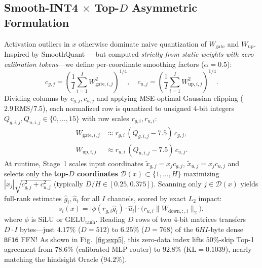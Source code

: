 \documentclass[10pt,twocolumn]{article}
\begin{document}
\subsection{Smooth-INT4 $\times$ Top-$D$ Asymmetric Formulation}
Activation outliers in $x$ otherwise dominate naive quantization of $W_{\mathrm{gate}}$ and $W_{\mathrm{up}}$. Inspired by SmoothQuant~\cite{xiao2023smoothquant}---but computed \emph{strictly from static weights with zero calibration tokens}---we define per-coordinate smoothing factors ($\alpha=0.5$):
\begin{equation}
  c_{g,j} = \left(\frac{1}{I}\sum_{i=1}^I W_{\mathrm{gate},i,j}^2\right)^{\!\!1/4}\!\!, \quad
  c_{u,j} = \left(\frac{1}{I}\sum_{i=1}^I W_{\mathrm{up},i,j}^2\right)^{\!\!1/4}\!\!.
\end{equation}
Dividing columns by $c_{g,j}, c_{u,j}$ and applying MSE-optimal Gaussian clipping ($2.9\,\mathrm{RMS}/7.5$), each normalized row is quantized to unsigned 4-bit integers $Q_{g,i,j}, Q_{u,i,j} \in \{0,\dots,15\}$ with row scales $r_{g,i}, r_{u,i}$:
\begin{equation}
  \begin{aligned}
    W_{\mathrm{gate},i,j} &\approx r_{g,i}\,(Q_{g,i,j} - 7.5)\,c_{g,j}, \\
    W_{\mathrm{up},i,j} &\approx r_{u,i}\,(Q_{u,i,j} - 7.5)\,c_{u,j}.
  \end{aligned}
\end{equation}
At runtime, Stage~1 scales input coordinates $\tilde{x}_{g,j} = x_j c_{g,j}$, $\tilde{x}_{u,j} = x_j c_{u,j}$ and selects only the \textbf{top-$D$ coordinates} $\mathcal{D}(x) \subset \{1,\dots,H\}$ maximizing $|x_j|\sqrt{c_{g,j}^2 + c_{u,j}^2}$ (typically $D/H \in [0.25, 0.375]$). Scanning only $j \in \mathcal{D}(x)$ yields full-rank estimates $\hat{g}_i, \hat{u}_i$ for all $I$ channels, scored by exact $L_2$ impact:
\begin{equation}
  \hat{s}_i(x) = \big|\phi(r_{g,i}\hat{g}_i)\cdot \hat{u}_i\big|\cdot \big(r_{u,i}\|W_{\mathrm{down},:,i}\|_2\big),
  \label{eq:score}
\end{equation}
where $\phi$ is $\mathrm{SiLU}$ or $\mathrm{GELU}_{\tanh}$. Reading $D$ rows of two 4-bit matrices transfers $D \cdot I$ bytes---just $4.17\%$ ($D=512$) to $6.25\%$ ($D=768$) of the $6HI$-byte dense \texttt{BF16} FFN! As shown in Fig.~\ref{fig:exp5}, this zero-data index lifts $50\%$-skip Top-1 agreement from $78.6\%$ (calibrated MLP router) to \textbf{$92.8\%$} ($\mathrm{KL}=0.1039$), nearly matching the hindsight Oracle ($94.2\%$).
\end{document}
